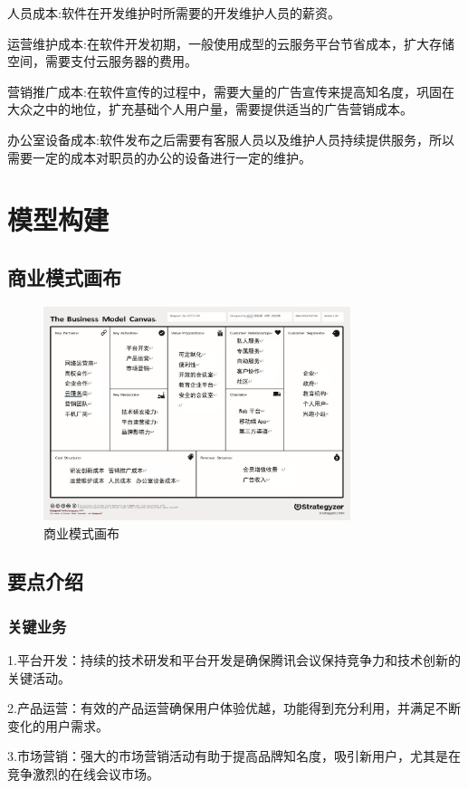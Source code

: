 \documentclass[a4paper,12pt]{article}
\begin{document}
    人员成本:软件在开发维护时所需要的开发维护人员的薪资。
    
    运营维护成本:在软件开发初期，一般使用成型的云服务平台节省成本，扩大存储空间，需要支付云服务器的费用。
    
    营销推广成本:在软件宣传的过程中，需要大量的广告宣传来提高知名度，巩固在大众之中的地位，扩充基础个人用户量，需要提供适当的广告营销成本。
    
    办公室设备成本:软件发布之后需要有客服人员以及维护人员持续提供服务，所以需要一定的成本对职员的办公的设备进行一定的维护。
    
    \section{模型构建}
    \subsection{商业模式画布}
    \begin{figure}[H]
        \centering
        \includegraphics[width=0.8\textwidth]{第三次商业模式画布.jpg}
        \caption{商业模式画布}
    \end{figure}
    \clearpage
    \subsection{要点介绍}
    \subsubsection{关键业务}
    1.平台开发：持续的技术研发和平台开发是确保腾讯会议保持竞争力和技术创新的关键活动。

    2.产品运营：有效的产品运营确保用户体验优越，功能得到充分利用，并满足不断变化的用户需求。

    3.市场营销：强大的市场营销活动有助于提高品牌知名度，吸引新用户，尤其是在竞争激烈的在线会议市场。
\end{document}
